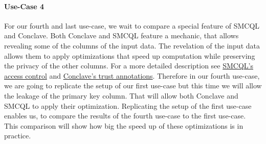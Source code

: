 \paragraph{Use-Case 4}
For our fourth and last use-case, we wait to compare a special feature of SMCQL and Conclave. Both Conclave and SMCQL feature a mechanic, that allows revealing some of the columns of the input data. The revelation of the input data allows them to apply optimizations that speed up computation while preserving the privacy of the other columns. For a more detailed description see \hyperref[Accesses_label]{SMCQL's access control} and \hyperref[Trust_label]{Conclave's trust annotations}. Therefore in our fourth use-case, we are going to replicate the setup of our first use-case but this time we will allow the leakage of the primary key column. That will allow both Conclave and SMCQL to apply their optimization. Replicating the setup of the first use-case enables us, to compare the results of the fourth use-case to the first use-case. This comparison will show how big the speed up of these optimizations is in practice. 
















